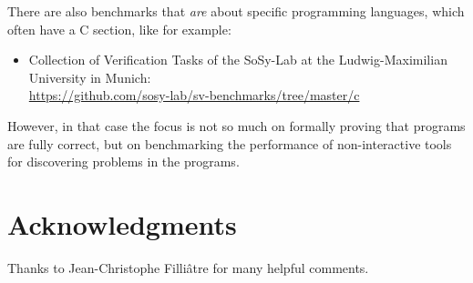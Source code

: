 \documentclass{article}
\begin{document}
There are also benchmarks that \emph{are} about specific programming languages,
which often have a C section, like for example:
\begin{itemize}
\item
Collection of Verification Tasks of the SoSy-Lab at the Ludwig-Maximilian University in Munich: \\
\url{https://github.com/sosy-lab/sv-benchmarks/tree/master/c}

\end{itemize}
However, in that case the focus is not so much on formally proving that programs
are fully correct, but on benchmarking the performance of non-interactive tools for discovering problems in the programs.

\section*{Acknowledgments}
Thanks to Jean-Christophe Filli\^atre for many helpful comments.



\end{document}
